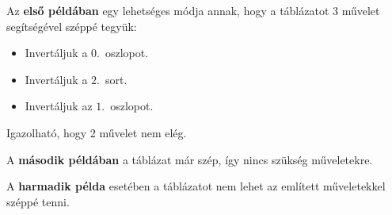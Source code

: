 

\Examples
\begin{example}
%
\end{example}


\Explanation
Az \textbf{első példában} egy lehetséges módja annak, hogy a táblázatot 3 művelet segítségével széppé tegyük:
\begin{itemize}
\item Invertáljuk a $0$.~oszlopot.
\item Invertáljuk a $2$.~sort.
\item Invertáljuk az $1$.~oszlopot.
\end{itemize}
Igazolható, hogy 2 művelet nem elég.

A \textbf{második példában} a táblázat már szép, így nincs szükség műveletekre.

A \textbf{harmadik példa} esetében a táblázatot nem lehet az említett műveletekkel széppé tenni.
%
%
